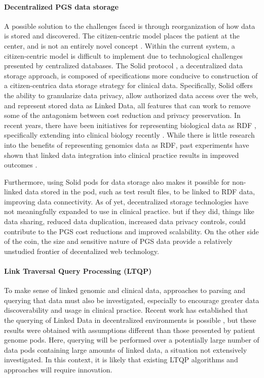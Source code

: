 \documentclass[a4paper,11pt]{article}
\begin{document}
\begin{refsection}
\paragraph{Decentralized PGS data storage}
A possible solution to the challenges faced is through reorganization of how data is stored and discovered. 
The citizen-centric model places the patient at the center, and is not an entirely novel concept \cite{brands_patient-centered_2022}.
Within the current system, a citizen-centric model is difficult to implement due to technological challenges presented by centralized databases.
The Solid protocol \cite{capadisli_solid_nodate}, a decentralized data storage approach, is composed of specifications more conducive to construction of a citizen-centrica data storage strategy for clinical data.
Specifically, Solid offers the ability to granularize data privacy, allow authorized data access over the web, and represent stored data as Linked Data, all features that can work to remove some of the antagonism between cost reduction and privacy preservation.
In recent years, there have been initiatives for representing biological data as RDF \cite{sib_swiss_institute_of_bioinformatics_rdf_group_members_sib_2024}, specifically extending into clinical biology recently \cite{van_der_horst_bridging_2023}. 
While there is little research into the benefits of representing genomics data as RDF, past experiments have shown that linked data integration into clinical practice results in improved outcomes \cite{farinelli_linked_2015}.

Furthermore, using Solid pods for data storage also makes it possible for non-linked data stored in the pod, such as test result files, to be linked to RDF data, improving data connectivity.
As of yet, decentralized storage technologies have not meaningfully expanded to use in clinical practice.
but if they did, things like data sharing, reduced data duplication, increased data privacy controls, could contribute to the PGS cost reductions and improved scalability.
On the other side of the coin, the size and sensitive nature of PGS data provide a relatively unstudied frontier of decentalized web technology.

\paragraph{Link Traversal Query Processing (LTQP)}
To make sense of linked genomic and clinical data, approaches to parsing and querying that data must also be investigated, especially to encourage greater data discoverability and usage in clinical practice.
Recent work has established that the querying of Linked Data in decentralized environments is possible \cite{taelman_evaluation_2023}, but these results were obtained with assumptions different than those presented by patient genome pods.
Here, querying will be performed over a potentially large number of data pods containing large amounts of linked data, a situation not extensively investigated. In this context, it is likely that existing LTQP algorithms and approaches will require innovation. 


\end{refsection}
\end{document}
